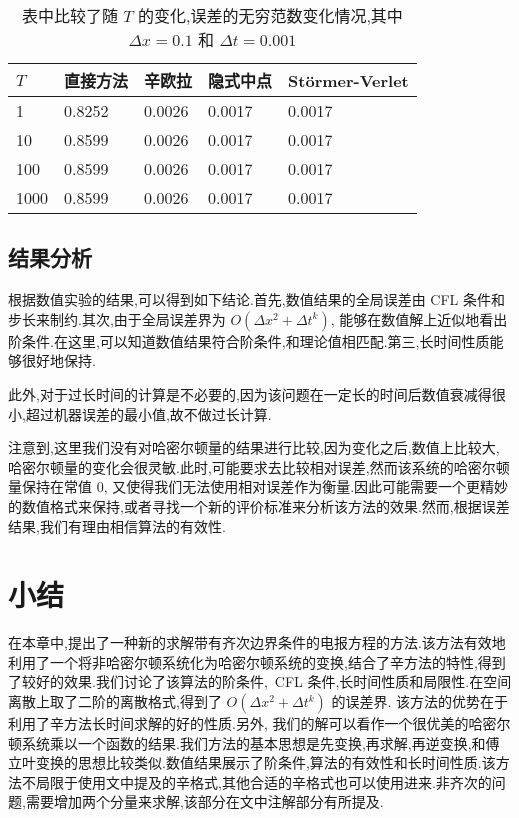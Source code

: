 \begin{table}[h]
  \centering
\caption{表中比较了随 $T$ 的变化,误差的无穷范数变化情况,其中 $\Delta x=0.1$ 和 $\Delta t=0.001$}
\begin{tabularx}{\linewidth}{XXXXX}
 \toprule[1.5pt]
 $T$ &直接方法 & 辛欧拉 & 隐式中点 & St\"{o}rmer-Verlet\\
 \midrule[1pt]
 1 & 0.8252 & 0.0026 & 0.0017 & 0.0017 \\
 10 & 0.8599 & 0.0026 & 0.0017 & 0.0017 \\
 100 & 0.8599 & 0.0026 & 0.0017 & 0.0017 \\
 1000 & 0.8599 & 0.0026 & 0.0017 & 0.0017 \\
 \bottomrule[1.5pt]
\end{tabularx}
  \label{tab:t3}
\end{table}

\subsection{结果分析}

根据数值实验的结果,可以得到如下结论.首先,数值结果的全局误差由 CFL 条件和步长来制约.其次,由于全局误差界为 $O(\Delta x^2+ \Delta t^k)$, 能够在数值解上近似地看出阶条件.在这里,可以知道数值结果符合阶条件,和理论值相匹配.第三,长时间性质能够很好地保持.

此外,对于过长时间的计算是不必要的,因为该问题在一定长的时间后数值衰减得很小,超过机器误差的最小值,故不做过长计算.

\begin{remark}
{\rm 注意到,这里我们没有对哈密尔顿量的结果进行比较,因为变化之后,数值上比较大,哈密尔顿量的变化会很灵敏.此时,可能要求去比较相对误差,然而该系统的哈密尔顿量保持在常值 $0$, 又使得我们无法使用相对误差作为衡量.因此可能需要一个更精妙的数值格式来保持,或者寻找一个新的评价标准来分析该方法的效果.然而,根据误差结果,我们有理由相信算法的有效性.}
\end{remark}

\section{小结}\label{sec:02conclusion}
在本章中,提出了一种新的求解带有齐次边界条件的电报方程的方法.该方法有效地利用了一个将非哈密尔顿系统化为哈密尔顿系统的变换,结合了辛方法的特性,得到了较好的效果.我们讨论了该算法的阶条件,~CFL 条件,长时间性质和局限性.在空间离散上取了二阶的离散格式,得到了 $O(\Delta x^2+ \Delta
t^k)$ 的误差界. 该方法的优势在于利用了辛方法长时间求解的好的性质.另外, 我们的解可以看作一个很优美的哈密尔顿系统乘以一个函数的结果.我们方法的基本思想是先变换,再求解,再逆变换,和傅立叶变换的思想比较类似.数值结果展示了阶条件,算法的有效性和长时间性质.该方法不局限于使用文中提及的辛格式,其他合适的辛格式也可以使用进来.非齐次的问题,需要增加两个分量来求解,该部分在文中注解部分有所提及.
